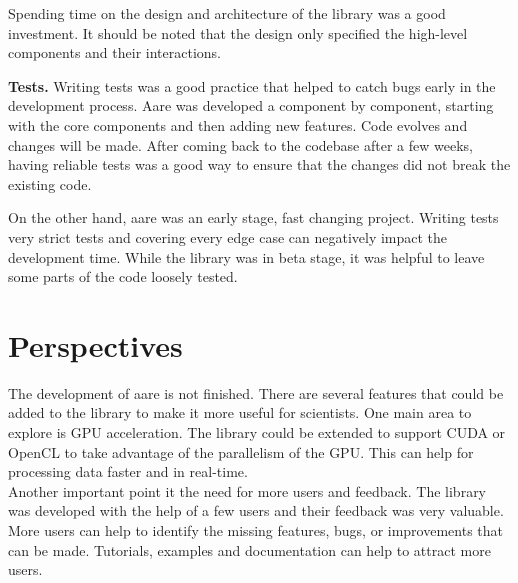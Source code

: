 \begin{spacing}{1.2}
Spending time on the design and architecture of the library was a good investment. It should be 
noted that the design only specified the high-level components and their interactions. 

\textbf{Tests.} Writing tests was a good practice that helped to catch bugs early in the
development process. Aare was developed a component by component, starting with the core components
and then adding new features. Code evolves and changes will be made. After coming 
back to the codebase after a few weeks, having reliable tests was a good way to ensure that
the changes did not break the existing code.

On the other hand, aare was an early stage, fast changing project. Writing tests very strict 
tests and covering every edge case can negatively impact the development time. While the 
library was in beta stage, it was helpful to leave some parts of the code loosely tested.\\

\section*{Perspectives}
The development of aare is not finished. There are several features that could be added
to the library to make it more useful for scientists. One main area to explore is GPU 
acceleration. The library could be extended to support CUDA or OpenCL to take advantage
of the parallelism of the GPU. This can help for processing data faster and in real-time.\\

Another important point it the need for more users and feedback. The library was developed
with the help of a few users and their feedback was very valuable. More users can help to
identify the missing features, bugs, or improvements that can be made. Tutorials, examples 
and documentation can help to attract more users.\\










\end{spacing}